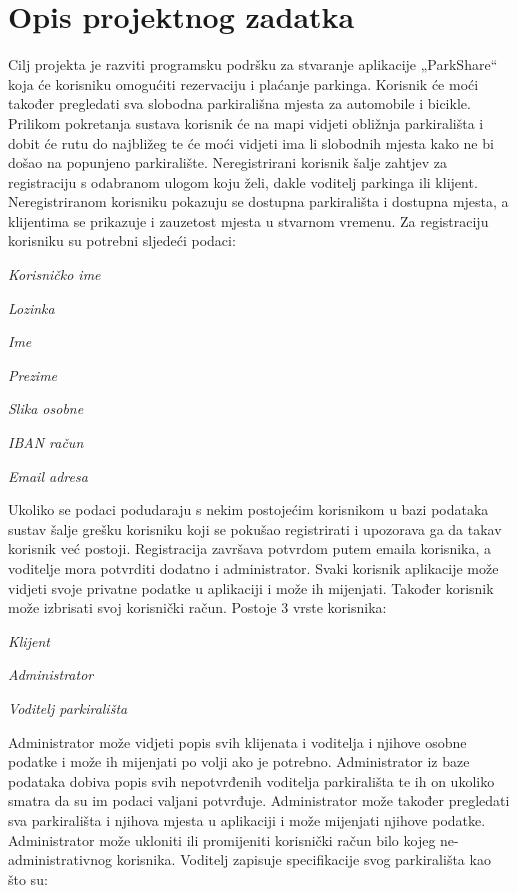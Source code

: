 \chapter{Opis projektnog zadatka}
		
		
		Cilj projekta je razviti programsku podršku za stvaranje aplikacije „ParkShare“ koja će korisniku omogućiti rezervaciju i plaćanje parkinga. Korisnik će moći također pregledati sva slobodna parkirališna mjesta za automobile i bicikle. Prilikom pokretanja sustava korisnik će na mapi vidjeti obližnja parkirališta i dobit će rutu do najbližeg te će moći vidjeti ima li slobodnih mjesta kako ne bi došao na popunjeno parkiralište.
Neregistrirani korisnik šalje zahtjev za registraciju s odabranom ulogom koju želi, dakle voditelj parkinga ili klijent. Neregistriranom korisniku pokazuju se dostupna parkirališta i dostupna mjesta, a klijentima se prikazuje i zauzetost mjesta u stvarnom vremenu. Za registraciju korisniku su potrebni sljedeći podaci:

		\begin{packed_item}
			\item \textit{Korisničko ime }
			\item \textit{Lozinka }
			\item \textit{Ime }
			\item \textit{Prezime}
			\item \textit{Slika osobne }
			\item \textit{IBAN račun }
			\item \textit{Email adresa }
		\end{packed_item}
		
	Ukoliko se podaci podudaraju s nekim postojećim korisnikom u bazi podataka sustav šalje grešku korisniku koji se pokušao registrirati i upozorava ga da takav korisnik već postoji. Registracija završava potvrdom putem emaila korisnika, a voditelje mora potvrditi dodatno i administrator. Svaki korisnik aplikacije može vidjeti svoje privatne podatke u aplikaciji i može ih mijenjati. Također korisnik može izbrisati svoj korisnički račun. 
Postoje 3 vrste korisnika:

                \begin{packed_item}
			\item \textit{Klijent }
			\item \textit{Administrator }
			\item \textit{Voditelj parkirališta}
		\end{packed_item}

Administrator može vidjeti popis svih klijenata i voditelja i njihove osobne podatke i može ih mijenjati po volji ako je potrebno. Administrator iz baze podataka dobiva popis svih nepotvrđenih voditelja parkirališta te ih on ukoliko smatra da su im podaci valjani potvrđuje. Administrator može također pregledati sva parkirališta i njihova mjesta u aplikaciji i može mijenjati njihove podatke. Administrator može ukloniti ili promijeniti korisnički račun bilo kojeg ne-administrativnog korisnika. 
Voditelj zapisuje specifikacije svog parkirališta kao što su:

